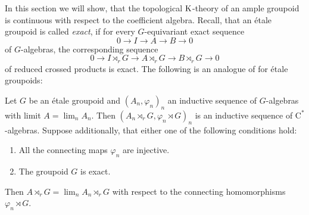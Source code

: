 In this section we will show, that the topological $\mathrm K$-theory of an ample groupoid is continuous with respect to the coefficient algebra.
	Recall, that an étale groupoid is called \textit{exact}, if for every $G$-equivariant exact sequence
	$$0\rightarrow I\rightarrow A\rightarrow B\rightarrow 0$$
	of $G$-algebras, the corresponding sequence
		$$0\rightarrow I\rtimes_r G\rightarrow A\rtimes_r G\rightarrow B\rtimes_r G \rightarrow 0$$
		of reduced crossed products is exact.
	The following is an analogue of \cite[Lemma~2.5]{MR2010742} for étale groupoids:
	\begin{lemma}\label{Lemma:Proper Groupoids and inductive limits}
		Let $G$ be an étale groupoid and $(A_n,\varphi_n)_n$ an inductive sequence of $G$-algebras with limit $A=\lim_n A_n$. Then $(A_n\rtimes_r G,\varphi_n\rtimes G)_n$ is an inductive sequence of $\mathrm{C}^*$-algebras. Suppose additionally, that either one of the following conditions hold:
		\begin{enumerate}
			\item All the connecting maps $\varphi_n$ are injective.
			\item The groupoid $G$ is exact.
		\end{enumerate}
		Then $A\rtimes_r G=\lim_n A_n\rtimes_r G$ with respect to the connecting homomorphisms $\varphi_n\rtimes G$.
	\end{lemma}
